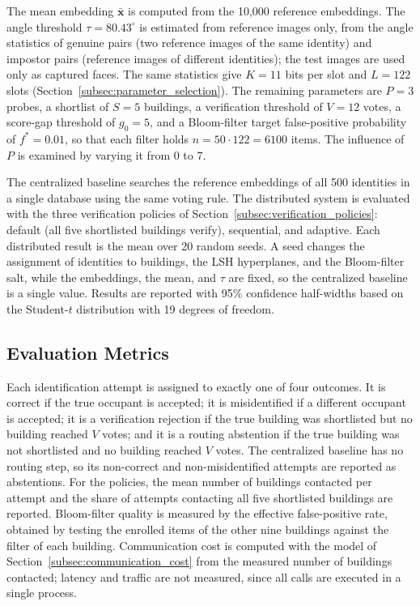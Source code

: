\documentclass[pdflatex,sn-mathphys-num]{sn-jnl}%
\theoremstyle{thmstyleone}%
\theoremstyle{thmstyletwo}%
\theoremstyle{thmstylethree}%
\begin{document}
The mean embedding $\bar{\mathbf{x}}$ is computed from the 10,000 reference embeddings. The angle threshold $\tau=80.43^{\circ}$ is estimated from reference images only, from the angle statistics of genuine pairs (two reference images of the same identity) and impostor pairs (reference images of different identities); the test images are used only as captured faces. The same statistics give $K=11$ bits per slot and $L=122$ slots (Section~\ref{subsec:parameter_selection}). The remaining parameters are $P=3$ probes, a shortlist of $S=5$ buildings, a verification threshold of $V=12$ votes, a score-gap threshold of $g_0=5$, and a Bloom-filter target false-positive probability of $f^*=0.01$, so that each filter holds $n=50\cdot122=6100$ items. The influence of $P$ is examined by varying it from 0 to 7.

The centralized baseline searches the reference embeddings of all 500 identities in a single database using the same voting rule. The distributed system is evaluated with the three verification policies of Section~\ref{subsec:verification_policies}: default (all five shortlisted buildings verify), sequential, and adaptive. Each distributed result is the mean over 20 random seeds. A seed changes the assignment of identities to buildings, the LSH hyperplanes, and the Bloom-filter salt, while the embeddings, the mean, and $\tau$ are fixed, so the centralized baseline is a single value. Results are reported with 95\% confidence half-widths based on the Student-$t$ distribution with 19 degrees of freedom.

\subsection{Evaluation Metrics}

Each identification attempt is assigned to exactly one of four outcomes. It is correct if the true occupant is accepted; it is misidentified if a different occupant is accepted; it is a verification rejection if the true building was shortlisted but no building reached $V$ votes; and it is a routing abstention if the true building was not shortlisted and no building reached $V$ votes. The centralized baseline has no routing step, so its non-correct and non-misidentified attempts are reported as abstentions. For the policies, the mean number of buildings contacted per attempt and the share of attempts contacting all five shortlisted buildings are reported. Bloom-filter quality is measured by the effective false-positive rate, obtained by testing the enrolled items of the other nine buildings against the filter of each building. Communication cost is computed with the model of Section~\ref{subsec:communication_cost} from the measured number of buildings contacted; latency and traffic are not measured, since all calls are executed in a single process.
\end{document}
